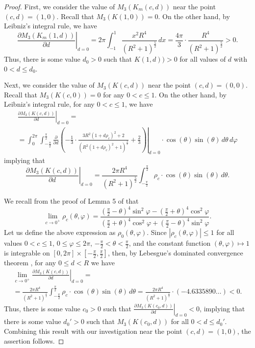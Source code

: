 \documentclass[twoside]{amsart}
\theoremstyle{plain}
\theoremstyle{definition}
\numberwithin{equation}{section}
\begin{document}
\begin{proof}
First, we consider the value of $M_3(K_m(c,d))$ near the point $(c,d)=(1,0)$. Recall that $M_3(K(1,0))=0$.
On the other hand, by Leibniz's integral rule, we have
\[
\left.\frac{\partial M_{3}(K_m(1,d))}{\partial d}\right|_{d=0} =2\pi\int_{-1}^{1}\frac{x^2R^4}{(R^2+1)^\frac{5}{2}}\,dx = \frac{4\pi}{3}\cdot \frac{R^4}{(R^2+1)^\frac{5}{2}} >0.
\]
Thus, there is some value $d_0> 0$ such that $K(1,d)) > 0$ for all values of $d$ with $0 < d \leq d_0$.

Next, we consider the value of $M_3(K(c,d))$ near the point $(c,d)=(0,0)$. Recall that $M_3(K(c,0))=0$ for any $0 < c \leq 1$.
On the other hand, by Leibniz's integral rule, for any $0 < c \leq 1$, we have
\begin{multline*}
\left.\frac{\partial M_{3}(K(c,d))}{\partial d}\right|_{d=0} = \\
=\int_{0}^{2\pi}\int_{-\frac{\pi}{2}}^{\frac{\pi}{2}}\left.\frac{\partial }{\partial d}\left(-\frac{1}{3}\cdot\frac{3R^2(1+d\rho_c)^2+2}{(R^2(1+d\rho_c)^2+1)^\frac{3}{2}}+\frac{2}{3}\right)\right|_{d=0}\cdot\cos(\theta)\sin(\theta)\,d\theta\,d\varphi
\end{multline*}
implying that
\[
\left.\frac{\partial M_{3}(K(c,d))}{\partial d}\right|_{d=0} = \frac{2\pi R^4}{(R^2+1)^\frac{5}{2}} \int_{-\frac{\pi}{2}}^{\frac{\pi}{2}}\rho_c\cdot\cos(\theta)\sin(\theta)\,d\theta.
\]

We recall from the proof of Lemma 5 of \cite{DLV} that
\[
\lim_{c\to 0^+}\rho_c(\theta,\varphi)=\frac{(\frac{\pi}{2}-\theta)^4\sin^2 \varphi-(\frac{\pi}{2}+\theta)^4\cos^2 \varphi}{(\frac{\pi}{2}+\theta)^4\cos^2 \varphi+(\frac{\pi}{2}-\theta)^4\sin^2 \varphi}.
\]
Let us define the above expression as $\rho_0(\theta,\varphi)$.
Since $| \rho_c(\theta,\varphi) | \leq 1$ for all values $0 < c \leq 1$, $0 \leq  \varphi \leq 2\pi$, $-\frac{\pi}{2} < \theta < \frac{\pi}{2}$, and the constant function $(\theta,\varphi) \mapsto 1$ is integrable on $[0,2\pi] \times \left[-\frac{\pi}{2}, \frac{\pi}{2} \right]$, then, by Lebesgue's dominated convergence theorem \cite{Evans}, for any $0 \leq d < R$ we have
\begin{multline}\label{eq:firstmomentfinal}
\lim_{c\to 0^+} \left.\frac{\partial M_{3}(K(c,d))}{\partial d}\right|_{d=0} =\\
= \frac{2\pi R^4}{(R^2+1)^\frac{5}{2}} \int_{-\frac{\pi}{2}}^{\frac{\pi}{2}}\rho_c\cdot\cos(\theta)\sin(\theta)\,d\theta = \frac{2\pi R^4}{(R^2+1)^\frac{5}{2}}
\cdot (-4.6335890\ldots) < 0.
\end{multline}
Thus, there is some value $c_0 > 0$ such that $\left.\frac{\partial M_{3}(K(c_0,d))}{\partial d}\right|_{d=0} < 0$, implying that there is some value $d_0'>0$ such that $M_{3}(K(c_0,d))$ for all $0 < d \leq d_0'$. Combining this result with our investigation near the point $(c,d)=(1,0)$, the assertion follows.
\end{proof}
\end{document}
